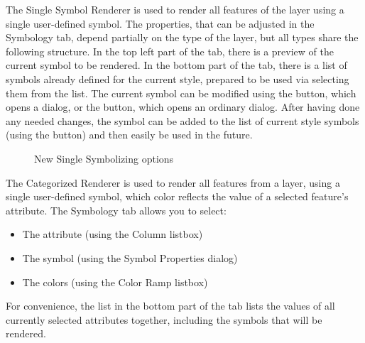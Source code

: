 
The Single Symbol Renderer is used to render all features of the layer using a 
single user-defined symbol. The properties, that can be adjusted in the 
Symbology tab, depend partially on the type of the layer, but all types share 
the following structure. In the top left part of the tab, there is a preview of 
the current symbol to be rendered. In the bottom part of the tab, there is a 
list of symbols already defined for the current style, prepared to be used via 
selecting them from the list. The current symbol can be modified using the 
 button, which opens a  dialog, or 
the  button, which opens an ordinary  dialog.
After having done any needed changes, the symbol can be added to the list of 
current style symbols (using the  button) and then easily 
be used in the future.
 
\begin{figure}[h]
\centering
\caption{New Single Symbolizing options \nixcaption}
   \goodgap
   \goodgap
\end{figure}


The Categorized Renderer is used to render all features from a layer, using a 
single user-defined symbol, which color reflects the value of a selected 
feature's attribute. The Symbology tab allows you to select:

\begin{itemize}
\item The attribute (using the Column listbox)
\item The symbol (using the Symbol Properties dialog)
\item The colors (using the Color Ramp listbox)  
\end{itemize}

For convenience, the list in the bottom part of the tab lists the values of 
all currently selected attributes together, including the symbols that will 
be rendered.

